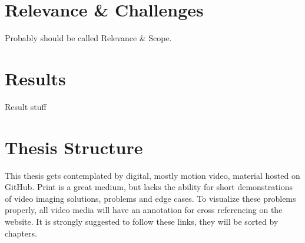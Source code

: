 \section{Relevance \& Challenges}
\label{sec:intro:relevance}

Probably should be called Relevance \& Scope.

\section{Results}
\label{sec:intro:results}

Result stuff

\section{Thesis Structure}
\label{sec:intro:structure}

This thesis gets contemplated by digital, mostly motion video, material hosted 
on GitHub. Print is a great medium, but lacks the ability for short 
demonstrations of video imaging solutions, problems and edge cases. To 
visualize these problems properly, all video media will have an annotation for 
cross referencing on the website. It is strongly suggested to follow these 
links, they will be sorted by chapters.